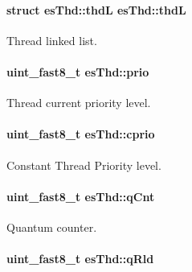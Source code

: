 \hypertarget{structesThd_aacfdf777fcd4619fdcc33c2e57d4810c}{
\paragraph[{thd\-L}]{\setlength{\rightskip}{0pt plus 5cm}struct {\bf es\-Thd\-::thd\-L}                {\bf es\-Thd\-::thd\-L}}}\label{structesThd_aacfdf777fcd4619fdcc33c2e57d4810c}


Thread linked list. 

\hypertarget{structesThd_a8d1877cabc7d4e637f96f4b4d5b0da09}{
\paragraph[{prio}]{\setlength{\rightskip}{0pt plus 5cm}uint\-\_\-fast8\-\_\-t es\-Thd\-::prio}}\label{structesThd_a8d1877cabc7d4e637f96f4b4d5b0da09}


Thread current priority level. 

\hypertarget{structesThd_aae7431d7fca3051dff47aaf4b9f7c855}{
\paragraph[{cprio}]{\setlength{\rightskip}{0pt plus 5cm}uint\-\_\-fast8\-\_\-t es\-Thd\-::cprio}}\label{structesThd_aae7431d7fca3051dff47aaf4b9f7c855}


Constant Thread Priority level. 

\hypertarget{structesThd_a5721e76b02321c6701e52a9788d9bf1e}{
\paragraph[{q\-Cnt}]{\setlength{\rightskip}{0pt plus 5cm}uint\-\_\-fast8\-\_\-t es\-Thd\-::q\-Cnt}}\label{structesThd_a5721e76b02321c6701e52a9788d9bf1e}


Quantum counter. 

\hypertarget{structesThd_a3c2c5e4b699e3c990e37000650f031ba}{
\paragraph[{q\-Rld}]{\setlength{\rightskip}{0pt plus 5cm}uint\-\_\-fast8\-\_\-t es\-Thd\-::q\-Rld}}\label{structesThd_a3c2c5e4b699e3c990e37000650f031ba}


